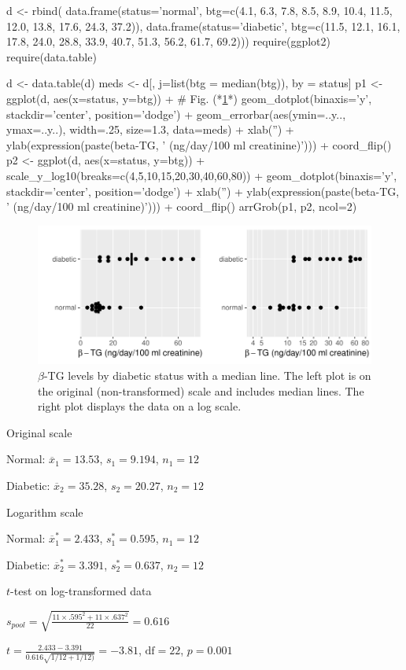 \begin{Schunk}
\begin{Sinput}
d <- rbind(
  data.frame(status='normal',
             btg=c(4.1, 6.3, 7.8, 8.5, 8.9, 10.4, 11.5, 12.0, 13.8,
                   17.6, 24.3, 37.2)),
  data.frame(status='diabetic',
             btg=c(11.5, 12.1, 16.1, 17.8, 24.0, 28.8, 33.9, 40.7,
                   51.3, 56.2, 61.7, 69.2)))
require(ggplot2)
require(data.table)
\end{Sinput}
\begin{Sinput}
d <- data.table(d)
meds <- d[, j=list(btg = median(btg)), by = status]
p1 <- 
  ggplot(d, aes(x=status, y=btg)) +    # Fig. (*\ref{fig:change-diabetes}*)
  geom_dotplot(binaxis='y', stackdir='center', position='dodge') +
  geom_errorbar(aes(ymin=..y.., ymax=..y..), width=.25, size=1.3, data=meds) +
   xlab('') + ylab(expression(paste(beta-TG, ' (ng/day/100 ml creatinine)'))) + 
  coord_flip()
p2 <- ggplot(d, aes(x=status, y=btg)) +
  scale_y_log10(breaks=c(4,5,10,15,20,30,40,60,80)) +
  geom_dotplot(binaxis='y', stackdir='center', position='dodge') +
  xlab('') + ylab(expression(paste(beta-TG, ' (ng/day/100 ml creatinine)'))) +
  coord_flip()
arrGrob(p1, p2, ncol=2)
\end{Sinput}
\begin{figure}[htbp]

\centerline{\includegraphics{change-diabetes-1} }

\caption[$\beta$-TG levels by diabetic status]{$\beta$-TG levels by diabetic status with a median line.  The left plot is on the original (non-transformed) scale and includes median lines.  The right plot displays the data on a log scale.}\label{fig:change-diabetes}
\end{figure}
\end{Schunk}
\bi
 \item Original scale
  \bi
   \item Normal: $\overline{x}_1 = 13.53$, $s_1 = 9.194$, $n_1 = 12$
   \item Diabetic: $\overline{x}_2 = 35.28$, $s_2 = 20.27$, $n_2 = 12$
  \ei
 \item Logarithm scale
  \bi
   \item Normal: $\overline{x}_1^* = 2.433$, $s_1^* = 0.595$, $n_1 = 12$
   \item Diabetic: $\overline{x}_2^* = 3.391$, $s_2^* = 0.637$, $n_2 = 12$
  \ei
  \item $t$-test on log-transformed data
  \bi
    \item $s_{pool} = \sqrt{\frac{11 \times .595^2 + 11 \times .637^2}{22}} = 0.616$
    \item $t = \frac{2.433-3.391}{0.616\sqrt{1/12 + 1/12)}} = -3.81$, $\textrm{df} = 22$,  $p = 0.001$
  \ei

